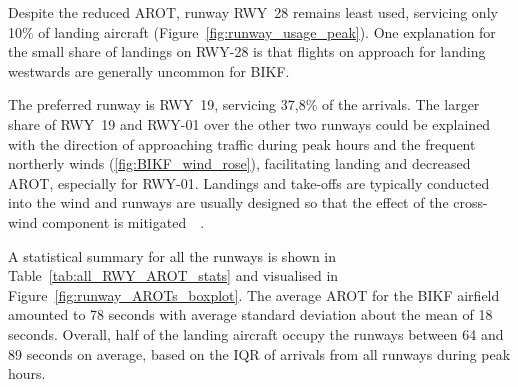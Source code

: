 Despite the reduced AROT, runway RWY~28 remains least used, servicing only 10$\%$ of landing aircraft (Figure~\ref{fig:runway_usage_peak}). One explanation for the small share of landings on RWY-28 is that flights on approach for landing westwards are generally uncommon for BIKF. 

The preferred runway is RWY~19, servicing 37,8$\%$ of the arrivals. The larger share of RWY~19 and RWY-01 over the other two runways could be explained with the direction of approaching traffic during peak hours and the frequent northerly winds (\ref{fig:BIKF_wind_rose}), facilitating landing and decreased AROT, especially for RWY-01. Landings and take-offs are typically conducted into the wind and runways are usually designed so that the effect of the cross-wind component is mitigated~\cite[p.~301]{de_neufville_airport_2013}~\cite{manual1991_doc9157}.

\begin{table}[h]
\centering
{}
\caption[AROTs during peak hours by runway]{AROT statistics for the air traffic mix at BIKF by runway. The count is the number of landings during peak hours from October 2017 to November 2018.}
\label{tab:all_RWY_AROT_stats}
\end{table}

A statistical summary for all the runways is shown in Table~\ref{tab:all_RWY_AROT_stats} and visualised in Figure~\ref{fig:runway_AROTs_boxplot}. The average AROT for the BIKF airfield amounted to 78 seconds with average standard deviation about the mean of 18 seconds. Overall, half of the landing aircraft occupy the runways between 64 and 89 seconds on average, based on the IQR of arrivals from all runways during peak hours. 

